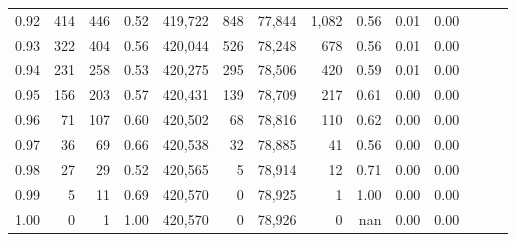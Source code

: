 \begin{tabular}{rrrrrrrrrrrrrr}
0.92 &    414 &    446 &  0.52 &  419,722 &      848 &  77,844 &   1,082 &  0.56 &  0.01 &      0.00 \\
0.93 &    322 &    404 &  0.56 &  420,044 &      526 &  78,248 &     678 &  0.56 &  0.01 &      0.00 \\
0.94 &    231 &    258 &  0.53 &  420,275 &      295 &  78,506 &     420 &  0.59 &  0.01 &      0.00 \\
0.95 &    156 &    203 &  0.57 &  420,431 &      139 &  78,709 &     217 &  0.61 &  0.00 &      0.00 \\
0.96 &     71 &    107 &  0.60 &  420,502 &       68 &  78,816 &     110 &  0.62 &  0.00 &      0.00 \\
0.97 &     36 &     69 &  0.66 &  420,538 &       32 &  78,885 &      41 &  0.56 &  0.00 &      0.00 \\
0.98 &     27 &     29 &  0.52 &  420,565 &        5 &  78,914 &      12 &  0.71 &  0.00 &      0.00 \\
0.99 &      5 &     11 &  0.69 &  420,570 &        0 &  78,925 &       1 &  1.00 &  0.00 &      0.00 \\
1.00 &      0 &      1 &  1.00 &  420,570 &        0 &  78,926 &       0 &   nan &  0.00 &      0.00 \\
\bottomrule
\end{tabular}
